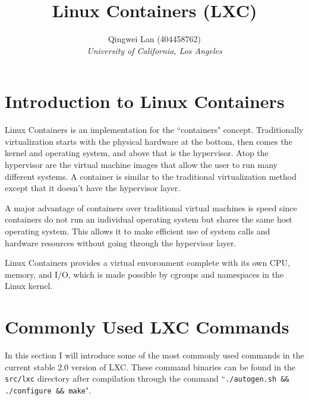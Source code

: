 \documentclass[12pt]{article}
\begin{document}
\title{Linux Containers (LXC)}
\author{Qingwei Lan (404458762)\\ \textit{University of California, Los Angeles}}
\maketitle

\newenvironment{dent}{\begin{adjustwidth}{0.35in}{}}{\end{adjustwidth}}



\section{Introduction to Linux Containers}

Linux Containers is an implementation for the ``containers" concept. Traditionally virtualization starts with the physical hardware at the bottom, then comes the kernel and operating system, and above that is the hypervisor. Atop the hypervisor are the virtual machine images that allow the user to run many different systems. A container is similar to the traditional virtualization method except that it doesn't have the hypervisor layer.

A major advantage of containers over traditional virtual machines is speed since containers do not run an individual operating system but shares the same host operating system. This allows it to make efficient use of system calls and hardware resources without going through the hypervisor layer.

Linux Containers provides a virtual envoronment complete with its own CPU, memory, and I/O, which is made possible by cgroups and namespaces in the Linux kernel.



\section{Commonly Used LXC Commands}

In this section I will introduce some of the most commonly used commands in the current stable 2.0 version of LXC. These command binaries can be found in the \texttt{src/lxc} directory after compilation through the command ``\texttt{./autogen.sh \&\& ./configure \&\& make}".
\end{document}
